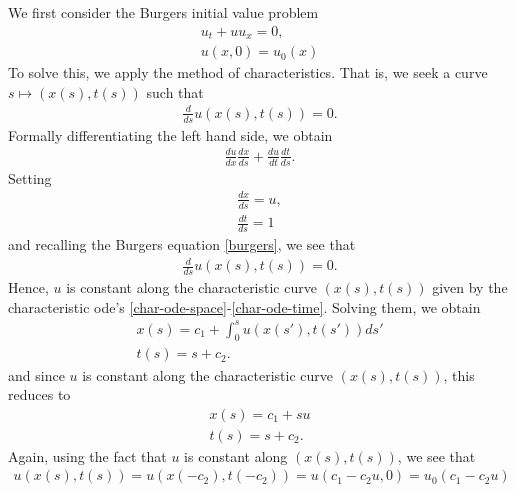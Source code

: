 \documentclass[12pt,reqno]{amsart}
\numberwithin{equation}{section}  %
\numberwithin{figure}{section}
\begin{document}
We first consider the Burgers initial value problem
%
%
\begin{gather}
    \label{burgers}
u_{t} + uu_{x} = 0,
\\
\label{burgers-init}
u(x,0) = u_{0}(x)
\end{gather}
%
%
To solve this, we apply the method of characteristics. That is, we seek a curve
$s \mapsto (x(s), t(s))$ such that
%
%
\begin{equation*}
\begin{split}
\frac{d}{ds} u(x(s), t(s)) = 0.
\end{split}
\end{equation*}
%
Formally differentiating the left hand side, we obtain
%
%
\begin{equation*}
\begin{split}
\frac{du}{dx} \frac{dx}{ds} + \frac{du}{dt} \frac{dt}{ds}.
\end{split}
\end{equation*}
%
%
Setting
%
%
\begin{gather}
    \label{char-ode-space}
    \frac{dx}{ds} = u,
    \\
    \label{char-ode-time}
    \frac{dt}{ds}=1
\end{gather}
and recalling the Burgers equation \eqref{burgers}, we see that
%
%
\begin{equation*}
\begin{split}
\frac{d}{ds} u(x(s), t(s)) = 0.
\end{split}
\end{equation*}
%
%
Hence, $u$ is constant along the characteristic curve $(x(s), t(s))$ given by
the characteristic ode's \eqref{char-ode-space}-\eqref{char-ode-time}. Solving
them, we obtain
\begin{gather}
    \label{0j}
    x(s) = c_{1} + \int_{0}^{s} u(x(s'), t(s'))ds'
    \\
    t(s) = s + c_{2}.
\end{gather}
and since $u$ is constant along the characteristic curve $(x(s), t(s))$, this reduces to
%
%
\begin{gather}
    \label{1j}
    x(s) = c_{1} + su
    \\
    \label{2j}
    t(s) = s + c_{2}.
\end{gather}
%
Again, using the fact that $u$ is constant along $(x(s), t(s))$, we see that
%
%
%
%
\begin{equation*}
\begin{split}
u(x(s),t(s)) = u(x(-c_{2}), t(-c_{2})) = u(c_{1} - c_{2}u, 0 ) = u_{0}(c_{1} - c_{2} u)
\end{split}
\end{equation*}
\end{document}
